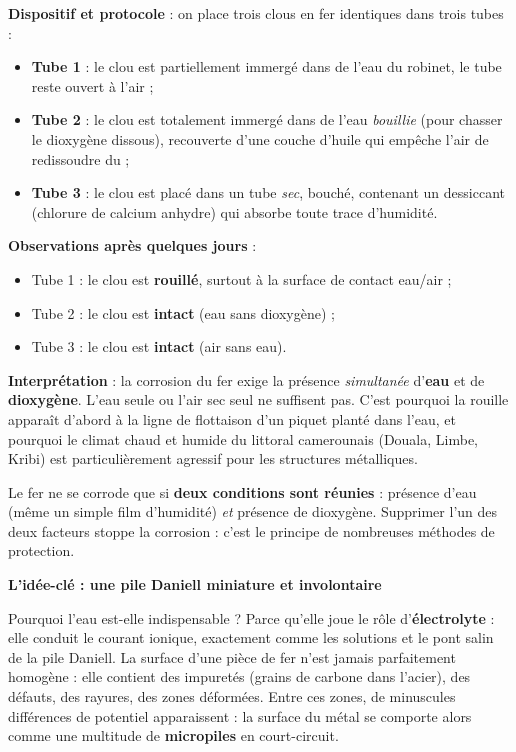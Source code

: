 \documentclass[11pt]{article}
\newcommand{\cle}[1]{{\popxbold\color{popdark}#1}}
\newcounter{popsec}
\newcounter{popsub}
\newcommand{\courssub}[1]{%
  \stepcounter{popsub}%
  \par\vspace{9pt}\noindent{\popxbold\fontsize{11.5}{13}\selectfont\color{popink}{\color{poporange}\thepopsec.\thepopsub}\hspace{6pt}#1}\par\nopagebreak\vspace{4pt}
}
\begin{document}
\begin{experience}
\textbf{Dispositif et protocole} : on place trois clous en fer identiques dans trois tubes :
\begin{itemize}
\item \textbf{Tube 1} : le clou est partiellement immergé dans de l'eau du robinet, le tube reste ouvert à l'air ;
\item \textbf{Tube 2} : le clou est totalement immergé dans de l'eau \emph{bouillie} (pour chasser le dioxygène dissous), recouverte d'une couche d'huile qui empêche l'air de redissoudre du  ;
\item \textbf{Tube 3} : le clou est placé dans un tube \emph{sec}, bouché, contenant un dessiccant (chlorure de calcium anhydre) qui absorbe toute trace d'humidité.
\end{itemize}
\textbf{Observations après quelques jours} :
\begin{itemize}
\item Tube 1 : le clou est \textbf{rouillé}, surtout à la surface de contact eau/air ;
\item Tube 2 : le clou est \textbf{intact} (eau sans dioxygène) ;
\item Tube 3 : le clou est \textbf{intact} (air sans eau).
\end{itemize}
\textbf{Interprétation} : la corrosion du fer exige la présence \emph{simultanée} d'\textbf{eau} et de \textbf{dioxygène}. L'eau seule ou l'air sec seul ne suffisent pas. C'est pourquoi la rouille apparaît d'abord à la ligne de flottaison d'un piquet planté dans l'eau, et pourquoi le climat chaud et humide du littoral camerounais (Douala, Limbe, Kribi) est particulièrement agressif pour les structures métalliques.
\end{experience}

\begin{aretenir}
Le fer ne se corrode que si \textbf{deux conditions sont réunies} : présence d'\cle{eau} (même un simple film d'humidité) \emph{et} présence de \cle{dioxygène}. Supprimer l'un des deux facteurs stoppe la corrosion : c'est le principe de nombreuses méthodes de protection.
\end{aretenir}

\courssub{Mécanisme de la corrosion : les micropiles}

\textbf{L'idée-clé : une pile Daniell miniature et involontaire}\par
Pourquoi l'eau est-elle indispensable ? Parce qu'elle joue le rôle d'\textbf{électrolyte} : elle conduit le courant ionique, exactement comme les solutions et le pont salin de la pile Daniell. La surface d'une pièce de fer n'est jamais parfaitement homogène : elle contient des impuretés (grains de carbone dans l'acier), des défauts, des rayures, des zones déformées. Entre ces zones, de minuscules différences de potentiel apparaissent : la surface du métal se comporte alors comme une multitude de \textbf{micropiles} en court-circuit.
\end{document}
